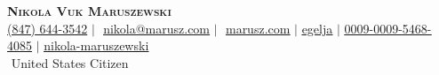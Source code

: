 \begin{center}
  \textbf{\Huge \scshape Nikola Vuk Maruszewski} \\
  \vspace{4pt}%
  \small%
  \faPhone* \href{tel:(847) 644-3542}{(847) 644-3542}
  $|$ \faEnvelope\,\,\href{mailto:nikola@marusz.com}{\underline{nikola@marusz.com}}
  $|$ \faGlobe\,\,\href{https://marusz.com}{\underline{marusz.com}}
  $|$  \href{https://github.com/egelja}{\underline{egelja}}
  $|$  \href{https://orcid.org/0009-0009-5468-4085}{\underline{0009-0009-5468-4085}}
  $|$  \href{https://www.linkedin.com/in/nikola-maruszewski/}{\underline{nikola-maruszewski}}
  \\
  \vspace{3pt}%
  \,\,United States Citizen
\end{center}
